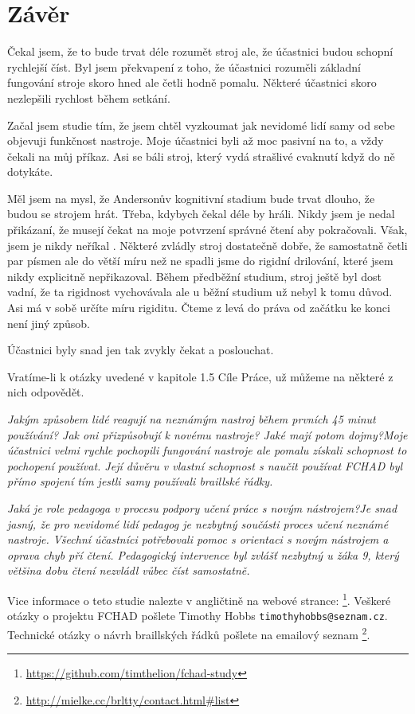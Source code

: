 \chapter{Závěr}
Čekal jsem, že to bude trvat déle rozumět stroj ale, že účastnici budou schopní rychlejší číst. Byl jsem překvapení z toho, že účastnici rozuměli základní fungování stroje skoro hned ale četli hodně pomalu. Některé účastnici skoro nezlepšili rychlost během setkání.

Začal jsem studie tím, že jsem chtěl vyzkoumat jak nevidomé lidí samy od sebe objevuji funkčnost nastroje. Moje účastnici byli až moc pasivní na to, a vždy čekali na můj příkaz. Asi se báli stroj, který vydá strašlivé cvaknutí když do ně dotykáte.

Měl jsem na mysl, že Andersonův kognitivní stadium bude trvat dlouho, že budou se strojem hrát. Třeba, kdybych čekal déle by hráli. Nikdy jsem je nedal přikázaní, že musejí čekat na moje potvrzení správné čtení aby pokračovali. Však, jsem je nikdy neříkal . Některé zvládly stroj dostatečně dobře, že samostatně četli par písmen ale do větší míru než ne spadli jsme do rigidní drilování, které jsem nikdy explicitně nepřikazoval. Během předběžní studium, stroj ještě byl dost vadní, že ta rigidnost vychovávala ale u běžní studium už nebyl k tomu důvod. Asi  má v sobě určíte míru rigiditu. Čteme z levá do práva od začátku ke konci není jiný způsob.

Účastnici byly snad jen tak zvykly čekat a poslouchat.

Vratíme-li k otázky uvedené v kapitole 1.5 Cíle Práce, už můžeme na některé z nich odpovědět.

\em Jakým způsobem lidé reagují na neznámým nastroj během prvních 45 minut používání? Jak oni přizpůsobují k novému nastroje? Jaké mají potom dojmy?\em  Moje účastnici velmi rychle pochopili fungování nastroje ale pomalu získali schopnost to pochopení používat.  Její důvěru v vlastní schopnost s naučit používat FCHAD byl přímo spojení tím jestli samy používali braillské řádky.

\em Jaká je role pedagoga v procesu podpory učení práce s novým nástrojem?\em Je snad jasný, že pro nevidomé lidí pedagog je nezbytný součásti proces učení neznámé nastroje.  Všechní účastníci potřebovali pomoc s orientaci s novým nástrojem a oprava chyb pří čtení.  Pedagogický intervence byl zvlášť nezbytný u žáka 9, který většina dobu čtení nezvládl vůbec číst samostatně.

Vice informace o teto studie nalezte v angličtině na webové strance: \footnote{\url{https://github.com/timthelion/fchad-study}}.  Veškeré otázky o projektu FCHAD pošlete Timothy Hobbs {\tt timothyhobbs@seznam.cz}.  Technické otázky o návrh braillských řádků pošlete na emailový seznam
\footnote{\url{ http://mielke.cc/brltty/contact.html#list}}.


